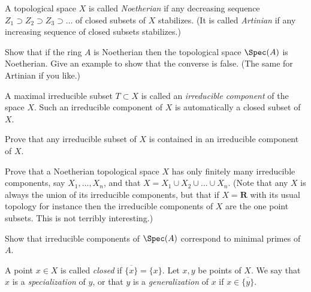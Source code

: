 \begin{definition}
\label{definition-Noetherian-space}
A topological space $X$ is called {\it Noetherian} if any
decreasing sequence $Z_1\supset Z_2 \supset Z_3\supset \ldots$
of closed subsets of $X$ stabilizes.
(It is called {\it Artinian} if any increasing sequence of closed
subsets stabilizes.)
\end{definition}

\begin{exercise}
\label{exercise-Noetherian-spec}
Show that if the ring $A$ is Noetherian then
the topological space $\Spec(A)$ is Noetherian. Give an
example to show that the converse is false. (The same for
Artinian if you like.)
\end{exercise}

\begin{definition}
\label{definition-irreducible-component}
A maximal irreducible subset $T\subset X$ is called an
{\it irreducible component} of the space $X$. Such an irreducible
component of $X$ is automatically a closed subset of $X$.
\end{definition}

\begin{exercise}
\label{exercise-irreducible-in-irreducible}
Prove that any irreducible subset
of $X$ is contained in an irreducible component of $X$.
\end{exercise}

\begin{exercise}
\label{exercise-Noetherian-finite-nr-irreducible}
Prove that a Noetherian topological space $X$
has only finitely many irreducible components, say $X_1, \ldots, X_n$,
and that $X = X_1\cup X_2\cup\ldots\cup X_n$. (Note that
any $X$ is always the union of its irreducible components, but that
if $X = {\mathbf R}$ with its usual topology for instance then the irreducible
components of $X$ are the one point subsets. This is not
terribly interesting.)
\end{exercise}

\begin{exercise}
\label{exercise-irreducible-components-minimal-primes}
Show that irreducible components of $\Spec(A)$
correspond to minimal primes of $A$.
\end{exercise}

\begin{definition}
\label{definition-closed}
A point $x\in X$ is called {\it closed} if $\overline{\{x\}} = \{ x\}$.
Let $x, y$ be points of $X$. We say that $x$ is a {\it specialization}
of $y$, or that $y$ is a {\it generalization} of $x$ if
$x\in \overline{\{y\}}$.
\end{definition}

